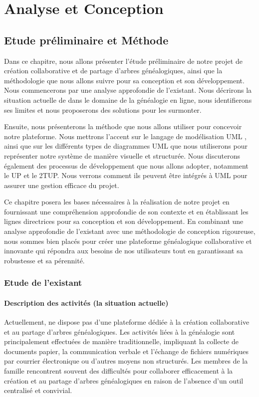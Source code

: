 \part{Analyse et Conception }
\label{part:analyse-et-conception}
\chapter{Etude préliminaire et Méthode}

Dans ce chapitre, nous allons présenter l’étude préliminaire de notre projet de
création collaborative et de partage d’arbres généalogiques, ainsi que la
méthodologie que nous allons suivre pour sa conception et son développement.
Nous commencerons par une analyse approfondie de l’existant. Nous décrirons la
situation actuelle de \firm dans le domaine de la généalogie en ligne, nous
identifierons ses limites et nous proposerons des solutions pour les surmonter.

Ensuite, nous présenterons la méthode que nous allons utiliser pour concevoir notre
plateforme. Nous mettrons l’accent sur le langage de modélisation \ac{UML} ,
ainsi que sur les différents types de diagrammes UML que nous utiliserons pour
représenter notre système de manière visuelle et structurée. Nous discuterons
également des processus de développement que nous allons adopter, notamment
le \ac{UP} et le \ac{2TUP}. Nous verrons comment ils peuvent être intégrés
à UML pour assurer une gestion efficace du projet.

Ce chapitre posera les bases nécessaires à la réalisation de notre projet en
fournissant une compréhension approfondie de son contexte et en établissant
les lignes directrices pour sa conception et son développement. En combinant
une analyse approfondie de l’existant avec une méthodologie de conception
rigoureuse, nous sommes bien placés pour créer une plateforme généalogique
collaborative et innovante qui répondra aux besoins de nos utilisateurs tout
en garantissant sa robustesse et sa pérennité.

\section{Etude de l'existant}
\subsection{Description des activités (la situation actuelle)}
Actuellement, \firm ne dispose pas d’une plateforme dédiée à la création
collaborative et au partage d’arbres généalogiques. Les activités liées à la
généalogie sont principalement effectuées de manière traditionnelle, impliquant
la collecte de documents papier, la communication verbale et l’échange de fichiers
numériques par courrier électronique ou d’autres moyens non structurés. Les
membres de la famille rencontrent souvent des difficultés pour collaborer
efficacement à la création et au partage d'arbres généalogiques en raison de
l'absence d'un outil centralisé et convivial.

